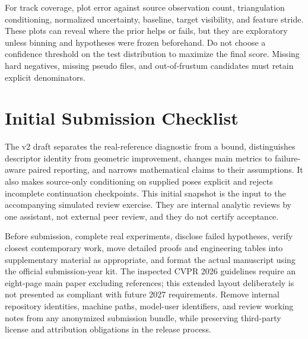 \documentclass[10pt,twocolumn,letterpaper]{article}
\begin{document}
For track coverage, plot error against source observation count, triangulation conditioning, normalized uncertainty, baseline, target visibility, and feature stride. These plots can reveal where the prior helps or fails, but they are exploratory unless binning and hypotheses were frozen beforehand. Do not choose a confidence threshold on the test distribution to maximize the final score. Missing hard negatives, missing pseudo files, and out-of-frustum candidates must retain explicit denominators.

\section{Initial Submission Checklist}
The v2 draft separates the real-reference diagnostic from a bound, distinguishes descriptor identity from geometric improvement, changes main metrics to failure-aware paired reporting, and narrows mathematical claims to their assumptions. It also makes source-only conditioning on supplied poses explicit and rejects incomplete continuation checkpoints. This initial snapshot is the input to the accompanying simulated review exercise. They are internal analytic reviews by one assistant, not external peer review, and they do not certify acceptance.

Before submission, complete real experiments, disclose failed hypotheses, verify closest contemporary work, move detailed proofs and engineering tables into supplementary material as appropriate, and format the actual manuscript using the official submission-year kit. The inspected CVPR 2026 guidelines require an eight-page main paper excluding references; this extended layout deliberately is not presented as compliant with future 2027 requirements. Remove internal repository identities, machine paths, model-user identifiers, and review working notes from any anonymized submission bundle, while preserving third-party license and attribution obligations in the release process.



\end{document}
